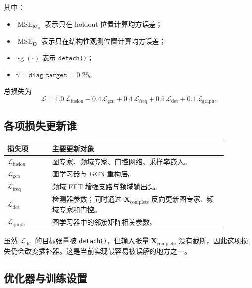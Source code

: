 \documentclass[UTF8]{ctexart}
\newcommand{\code}[1]{\texttt{#1}}
\begin{document}
其中：
\begin{itemize}
    \item \(\operatorname{MSE}_{\bm{M}_h}\) 表示只在 holdout 位置计算均方误差；
    \item \(\operatorname{MSE}_{\bm{O}}\) 表示只在结构性观测位置计算均方误差；
    \item \(\operatorname{sg}(\cdot)\) 表示 \code{detach()}；
    \item \(\gamma=\texttt{diag\_target}=0.25\)。
\end{itemize}

总损失为
\begin{equation}
    \mathcal{L}
    =
    1.0\,\mathcal{L}_{\text{fusion}}
    + 0.4\,\mathcal{L}_{\text{gcn}}
    + 0.4\,\mathcal{L}_{\text{freq}}
    + 0.5\,\mathcal{L}_{\text{det}}
    + 0.1\,\mathcal{L}_{\text{graph}}.
\end{equation}

\subsection{各项损失更新谁}

\begin{center}
\small
\begin{tabular}{p{0.18\linewidth}p{0.70\linewidth}}
\toprule
损失项 & 主要更新对象 \\
\midrule
\(\mathcal{L}_{\text{fusion}}\) & 图专家、频域专家、门控网络、采样率嵌入。 \\
\(\mathcal{L}_{\text{gcn}}\) & 图学习器与 GCN 重构层。 \\
\(\mathcal{L}_{\text{freq}}\) & 频域 FFT 增强支路与频域输出头。 \\
\(\mathcal{L}_{\text{det}}\) & 检测器参数；同时通过 \(\bm{X}_{\text{complete}}\) 反向更新图专家、频域专家和门控。 \\
\(\mathcal{L}_{\text{graph}}\) & 图学习器中的邻接矩阵相关参数。 \\
\bottomrule
\end{tabular}
\end{center}

虽然 \(\mathcal{L}_{\text{det}}\) 的目标张量被 \code{detach()}，但输入张量 \(\bm{X}_{\text{complete}}\) 没有截断，因此这项损失仍会改变插补器。这是当前实现最容易被误解的地方之一。

\subsection{优化器与训练设置}
\end{document}
